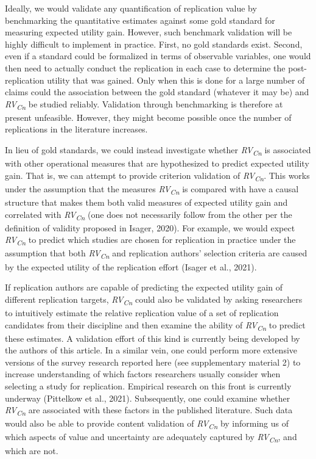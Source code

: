 \documentclass[
  man,floatsintext]{apa6}
\begin{document}
Ideally, we would validate any quantification of replication value by benchmarking the quantitative estimates against some gold standard for measuring expected utility gain. However, such benchmark validation will be highly difficult to implement in practice. First, no gold standards exist. Second, even if a standard could be formalized in terms of observable variables, one would then need to actually conduct the replication in each case to determine the post-replication utility that was gained. Only when this is done for a large number of claims could the association between the gold standard (whatever it may be) and \emph{RV\textsubscript{Cn}} be studied reliably. Validation through benchmarking is therefore at present unfeasible. However, they might become possible once the number of replications in the literature increases.

In lieu of gold standards, we could instead investigate whether \emph{RV\textsubscript{Cn}} is associated with other operational measures that are hypothesized to predict expected utility gain. That is, we can attempt to provide criterion validation of \emph{RV\textsubscript{Cn}}. This works under the assumption that the measures \emph{RV\textsubscript{Cn}} is compared with have a causal structure that makes them both valid measures of expected utility gain and correlated with \emph{RV\textsubscript{Cn}} (one does not necessarily follow from the other per the definition of validity proposed in Isager, 2020). For example, we would expect \emph{RV\textsubscript{Cn}} to predict which studies are chosen for replication in practice under the assumption that both \emph{RV\textsubscript{Cn}} and replication authors' selection criteria are caused by the expected utility of the replication effort (Isager et al., 2021).

If replication authors are capable of predicting the expected utility gain of different replication targets, \emph{RV\textsubscript{Cn}} could also be validated by asking researchers to intuitively estimate the relative replication value of a set of replication candidates from their discipline and then examine the ability of \emph{RV\textsubscript{Cn}} to predict these estimates. A validation effort of this kind is currently being developed by the authors of this article. In a similar vein, one could perform more extensive versions of the survey research reported here (see supplementary material 2) to increase understanding of which factors researchers usually consider when selecting a study for replication. Empirical research on this front is currently underway (Pittelkow et al., 2021). Subsequently, one could examine whether \emph{RV\textsubscript{Cn}} are associated with these factors in the published literature. Such data would also be able to provide content validation of \emph{RV\textsubscript{Cn}} by informing us of which aspects of value and uncertainty are adequately captured by \emph{RV\textsubscript{Cn}}, and which are not.
\end{document}
